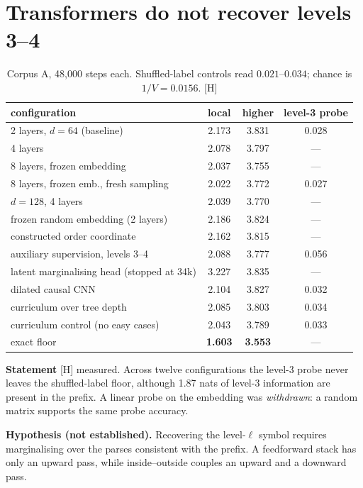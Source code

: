 \documentclass[11pt]{article}
\theoremstyle{definition}
\theoremstyle{remark}
\newcommand{\src}[1]{\textsf{\small[#1]}}
\newcommand{\st}[1]{\textsf{\small\color{gray}#1}}
\begin{document}
\section{Transformers do not recover levels 3--4}
\begin{table}[!htbp]\centering\small
\begin{tabular}{lccc}
\toprule
configuration & local & higher & level-3 probe\\
\midrule
2 layers, $d=64$ (baseline) & 2.173 & 3.831 & 0.028\\
4 layers & 2.078 & 3.797 & ---\\
8 layers, frozen embedding & 2.037 & 3.755 & ---\\
8 layers, frozen emb., fresh sampling & 2.022 & 3.772 & 0.027\\
$d=128$, 4 layers & 2.039 & 3.770 & ---\\
frozen random embedding (2 layers) & 2.186 & 3.824 & ---\\
constructed order coordinate & 2.162 & 3.815 & ---\\
auxiliary supervision, levels 3--4 & 2.088 & 3.777 & 0.056\\
latent marginalising head (stopped at 34k) & 3.227 & 3.835 & ---\\
dilated causal CNN & 2.104 & 3.827 & 0.032\\
curriculum over tree depth & 2.085 & 3.803 & 0.034\\
curriculum control (no easy cases) & 2.043 & 3.789 & 0.033\\
\midrule
exact floor & \textbf{1.603} & \textbf{3.553} & ---\\
\bottomrule
\end{tabular}
\caption{Corpus A, 48{,}000 steps each. Shuffled-label controls read $0.021$--$0.034$; chance is $1/V=0.0156$. \src{H}}
\end{table}

\noindent\textbf{Statement} \src{H} \st{measured}. Across twelve configurations the level-3 probe never leaves the shuffled-label floor, although 1.87 nats of level-3 information are present in the prefix. A linear probe on the embedding was \emph{withdrawn}: a random matrix supports the same probe accuracy.

\noindent\textbf{Hypothesis (not established).} Recovering the level-$\ell$ symbol requires marginalising over the parses consistent with the prefix. A feedforward stack has only an upward pass, while inside--outside couples an upward and a downward pass.
\end{document}
